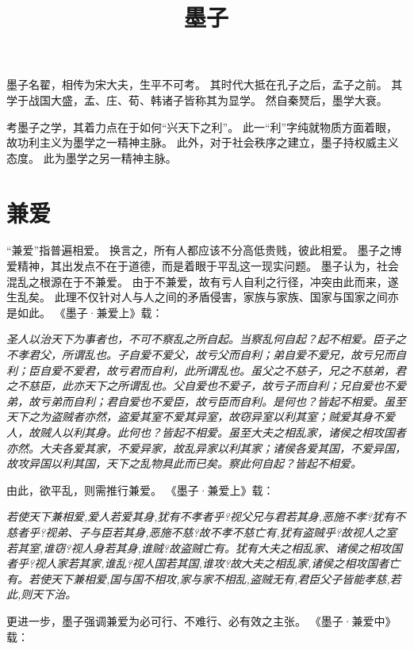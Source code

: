 \documentclass[11pt]{article}
\title{墨子}
\date{}
\begin{document}
  \maketitle
  
  \linenumbers

墨子名翟，相传为宋大夫，生平不可考。
其时代大抵在孔子之后，孟子之前。
其学于战国大盛，孟、庄、荀、韩诸子皆称其为显学。
然自秦燹后，墨学大衰。

\newline

考墨子之学，其着力点在于如何“兴天下之利”。
此一“利”字纯就物质方面着眼，故功利主义为墨学之一精神主脉。
此外，对于社会秩序之建立，墨子持权威主义态度。
此为墨学之另一精神主脉。

\section{兼爱}
“兼爱”指普遍相爱。
换言之，所有人都应该不分高低贵贱，彼此相爱。
墨子之博爱精神，其出发点不在于道德，而是着眼于平乱这一现实问题。
墨子认为，社会混乱之根源在于不兼爱。
由于不兼爱，故有亏人自利之行径，冲突由此而来，遂生乱矣。
此理不仅针对人与人之间的矛盾侵害，家族与家族、国家与国家之间亦是如此。
《墨子·兼爱上》载：

\textit{圣人以治天下为事者也，不可不察乱之所自起。当察乱何自起？起不相爱。臣子之不孝君父，所谓乱也。子自爱不爱父，故亏父而自利；弟自爱不爱兄，故亏兄而自利；臣自爱不爱君，故亏君而自利，此所谓乱也。虽父之不慈子，兄之不慈弟，君之不慈臣，此亦天下之所谓乱也。父自爱也不爱子，故亏子而自利；兄自爱也不爱弟，故亏弟而自利；君自爱也不爱臣，故亏臣而自利。是何也？皆起不相爱。虽至天下之为盗贼者亦然，盗爱其室不爱其异室，故窃异室以利其室；贼爱其身不爱人，故贼人以利其身。此何也？皆起不相爱。虽至大夫之相乱家，诸侯之相攻国者亦然。大夫各爱其家，不爱异家，故乱异家以利其家；诸侯各爱其国，不爱异国，故攻异国以利其国，天下之乱物具此而已矣。察此何自起？皆起不相爱。}

由此，欲平乱，则需推行兼爱。
《墨子·兼爱上》载：

\textit{若使天下兼相爱,爱人若爱其身,犹有不孝者乎?视父兄与君若其身,恶施不孝?犹有不慈者乎?视弟、子与臣若其身,恶施不慈?故不孝不慈亡有,犹有盗贼乎?故视人之室若其室,谁窃?视人身若其身,谁贼?故盗贼亡有。犹有大夫之相乱家、诸侯之相攻国者乎?视人家若其家,谁乱?视人国若其国,谁攻?故大夫之相乱家,诸侯之相攻国者亡有。若使天下兼相爱,国与国不相攻,家与家不相乱,盗贼无有,君臣父子皆能孝慈,若此,则天下治。}

更进一步，墨子强调兼爱为必可行、不难行、必有效之主张。
《墨子·兼爱中》载：
\end{document}
